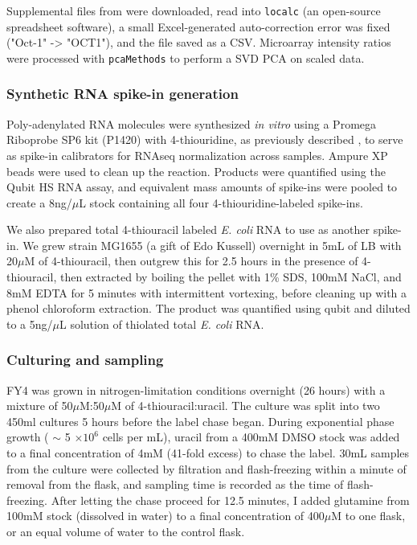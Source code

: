 Supplemental files from \cite{airoldi2016steady} were 
downloaded, read
into \texttt{localc} (an open-source spreadsheet software), 
a small Excel-generated auto-correction error was 
fixed ("Oct-1" -> "OCT1"), and the file saved as a CSV. Microarray 
intensity ratios were processed with 
\texttt{pcaMethods} to perform a SVD PCA on scaled data. 

\subsubsection{Synthetic RNA spike-in generation}

\label{subsubsection:spikeins}

Poly-adenylated RNA molecules were synthesized \emph{in vitro} using a
Promega Riboprobe SP6 kit (P1420) with 4-thiouridine, as previously
described \parencite{neymotin2014determination}, to serve as
spike-in calibrators for RNAseq normalization across samples.
Ampure XP beads were used to clean up the reaction.
Products were quantified using the Qubit HS RNA assay, and 
equivalent mass amounts of spike-ins were pooled to create a 
8ng/\(\mu\)L stock containing all four 4-thiouridine-labeled 
spike-ins.

We also prepared total 4-thiouracil labeled \emph{E. coli} RNA to 
use as another spike-in. We grew strain MG1655 (a gift of Edo Kussell)
overnight in 5mL of LB with 20\(\mu\)M of 4-thiouracil, then outgrew
this for 2.5 hours in the presence of 4-thiouracil, then extracted
by boiling the pellet with 1\% SDS, 100mM NaCl, and 8mM EDTA for 5
minutes with intermittent vortexing, before cleaning up with a phenol
chloroform extraction. The product was quantified using qubit and 
diluted to a 5ng/\(\mu\)L solution of thiolated total \emph{E. coli} 
RNA.

\subsubsection{Culturing and sampling}

FY4 was grown in nitrogen-limitation conditions overnight (26 hours) 
with a mixture of 50\(\mu\)M:50\(\mu\)M of 4-thiouracil:uracil. 
The culture was split into two 450ml cultures 5 hours before
the label chase began. During exponential phase growth ( \(\sim\) 5
\(\times 10^6\) cells per mL), uracil from a 400mM DMSO stock was added
to a final concentration of 4mM (41-fold excess) to chase the label.
30mL samples from the culture were collected by filtration and
flash-freezing within a minute of removal from the flask, and 
sampling time is recorded as the time of flash-freezing. 
After letting the chase proceed for 12.5 minutes, I added glutamine
from 100mM stock (dissolved in water) to a final concentration of
400\(\mu\)M to one flask, or an equal volume of water to the control
flask.

